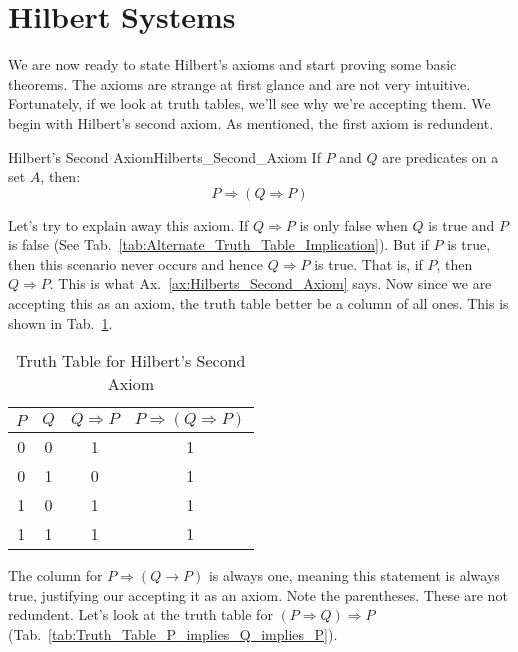 \section{Hilbert Systems}
    We are now ready to state Hilbert's axioms and start proving some basic
    theorems. The axioms are strange at first glance and are not very intuitive.
    Fortunately, if we look at truth tables, we'll see why we're accepting them.
    We begin with Hilbert's second axiom. As mentioned, the first axiom is
    redundent.
    \begin{faxiom}{Hilbert's Second Axiom}{Hilberts_Second_Axiom}
        If $P$ and $Q$ are \glspl{predicate} on a \gls{set} $A$, then:%
        \begin{equation*}
            P\Rightarrow(Q\Rightarrow{P})
        \end{equation*}
    \end{faxiom}
    Let's try to explain away this axiom. If $Q\Rightarrow{P}$ is only false
    when $Q$ is true and $P$ is false
    (See Tab.~\ref{tab:Alternate_Truth_Table_Implication}). But if $P$ is
    true, then this scenario never occurs and hence $Q\Rightarrow{P}$ is true.
    That is, if $P$, then $Q\Rightarrow{P}$. This is what
    Ax.~\ref{ax:Hilberts_Second_Axiom} says. Now since we are accepting this as
    an axiom, the truth table better be a column of all ones. This is shown in
    Tab.~\ref{tab:Truth_Table_Hilbert_Second_Axiom}.
    \begin{table}[H]
        \centering
        \captionsetup{type=table}
        \begin{tabular}{c|c|c|c}
            $P$&$Q$&$Q\Rightarrow{P}$&$P\Rightarrow(Q\Rightarrow{P})$\\
            \hline
            0&0&1&1\\
            0&1&0&1\\
            1&0&1&1\\
            1&1&1&1
        \end{tabular}
        \caption{Truth Table for Hilbert's Second Axiom}
        \label{tab:Truth_Table_Hilbert_Second_Axiom}
    \end{table}
    The column for $P\Rightarrow(Q\rightarrow{P})$ is always one, meaning this
    statement is always true, justifying our accepting it as an axiom. Note the
    parentheses. These are not redundent. Let's look at the truth table for
    $(P\Rightarrow{Q})\Rightarrow{P}$
    (Tab.~\ref{tab:Truth_Table_P_implies_Q_implies_P}).
